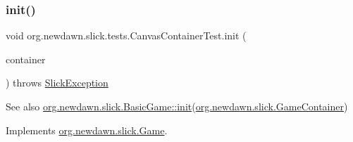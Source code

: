 \subsubsection{\texorpdfstring{init()}{init()}}
{\footnotesize\ttfamily void org.\+newdawn.\+slick.\+tests.\+Canvas\+Container\+Test.\+init (\begin{DoxyParamCaption}\item[{\mbox{\hyperlink{classorg_1_1newdawn_1_1slick_1_1_game_container}{Game\+Container}}}]{container }\end{DoxyParamCaption}) throws \mbox{\hyperlink{classorg_1_1newdawn_1_1slick_1_1_slick_exception}{Slick\+Exception}}\hspace{0.3cm}{\ttfamily [inline]}}

\begin{DoxySeeAlso}{See also}
\mbox{\hyperlink{classorg_1_1newdawn_1_1slick_1_1_basic_game_a8af0900217e4d389249f71367b22d114}{org.\+newdawn.\+slick.\+Basic\+Game\+::init}}(\mbox{\hyperlink{classorg_1_1newdawn_1_1slick_1_1_game_container}{org.\+newdawn.\+slick.\+Game\+Container}}) 
\end{DoxySeeAlso}


Implements \mbox{\hyperlink{interfaceorg_1_1newdawn_1_1slick_1_1_game_ad2dd6affab08bb8fdb5fab0815957b7a}{org.\+newdawn.\+slick.\+Game}}.


